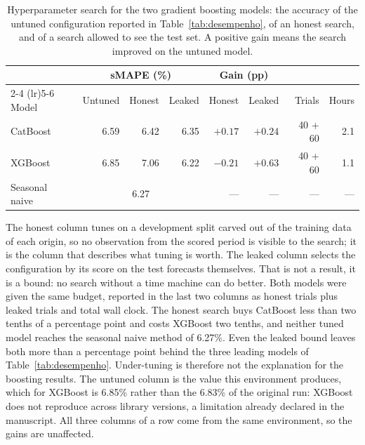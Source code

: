 \begin{table}[htbp]
\centering
\small
\setlength{\tabcolsep}{4pt}
\caption{Hyperparameter search for the two gradient boosting models: the accuracy of the
untuned configuration reported in Table~\ref{tab:desempenho}, of an honest search, and of
a search allowed to see the test set. A positive gain means the search improved on the
untuned model.}
\label{tab:optuna}
\begin{tabular}{lrrrrrrr}
\toprule
& \multicolumn{3}{c}{sMAPE (\%)} & \multicolumn{2}{c}{Gain (pp)} & & \\
\cmidrule(lr){2-4} \cmidrule(lr){5-6}
Model & Untuned & Honest & Leaked & Honest & Leaked & Trials & Hours \\
\midrule
CatBoost & 6.59 & 6.42 & 6.35 & $+0.17$ & $+0.24$ & 40 + 60 & 2.1 \\
XGBoost & 6.85 & 7.06 & 6.22 & $-0.21$ & $+0.63$ & 40 + 60 & 1.1 \\
\midrule
Seasonal naive & \multicolumn{3}{c}{6.27} & --- & --- & --- & --- \\
\bottomrule
\end{tabular}

\vspace{0.5em}
\begin{minipage}{\textwidth}
\footnotesize
The honest column tunes on a development split carved out of the training data of each
origin, so no observation from the scored period is visible to the search; it is the column
that describes what tuning is worth. The leaked column selects the configuration by its
score on the test forecasts themselves. That is not a result, it is a bound: no search
without a time machine can do better. Both models were given the same budget, reported in
the last two columns as honest trials plus leaked trials and total wall clock. The honest
search buys CatBoost less than two tenths of a percentage point and costs XGBoost two
tenths, and neither tuned model reaches the seasonal naive method of 6.27\%.
Even the leaked bound leaves both more than a percentage point behind the three leading
models of Table~\ref{tab:desempenho}. Under-tuning is therefore not the explanation for
the boosting results. The untuned column is the value this environment produces, which for
XGBoost is 6.85\% rather than the
6.83\% of the original run: XGBoost does not
reproduce across library versions, a limitation already declared in the manuscript. All
three columns of a row come from the same environment, so the gains are unaffected.
\end{minipage}
\end{table}